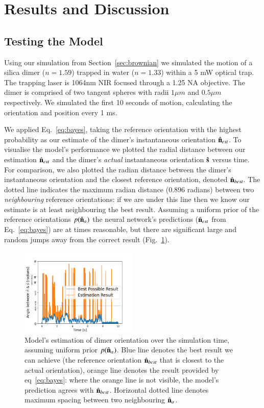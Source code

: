 \documentclass[final,  3p]{elsarticle}
\begin{document}
\section{Results and  Discussion}
\label{sec:Discussion}\subsection{Testing the Model}
\label{sec:test}
Using our simulation from Section~\ref{sec:brownian} we simulated the motion of a silica dimer ($n = 1.59$) trapped in water ($n = 1.33$) within a 5 mW optical trap. The trapping laser is 1064nm NIR focused through a 1.25 NA objective. The dimer is comprised of two tangent spheres with radii $1 \mu m$ and $0.5 \mu m$ respectively. We simulated the first 10 seconds of motion, calculating the orientation and position every 1 ms. 

We applied Eq.~\eqref{eq:bayes}, taking the reference orientation with the highest probability  as our estimate of the dimer's instantaneous orientation $\hat{\bf n}_{est}$. To visualise the model's performance  we plotted the radial distance between our estimation $\hat{\bf n}_{est}$ and the dimer's \emph{actual} instantaneous orientation $\hat{\bf s}$ versus time. For comparison, we also plotted the radian distance between the  dimer's instantaneous orientation and the closest reference orientation, denoted $\hat{\bf n}_{best}$. The dotted line indicates the maximum radian distance ($0.896$ radians) between two \textit{neighbouring} reference orientations: if we are under this line then we know our estimate is at least neighbouring the best result. Assuming a uniform prior of the reference orientations $p(\hat{\bf n}_\alpha)$  the neural network's predictions ($\hat{\bf n}_{est}$ from Eq.~\eqref{eq:bayes}) are at times reasonable, but there are significant large and random jumps away from the correct result (Fig.~\ref{fig:uniform}). 

\begin{figure}[h]
	\centering
	\includegraphics[width=0.5\textwidth]{./Images/fig3.png}
	\caption{Model's estimation of dimer orientation over the simulation time, assuming uniform prior $p(\hat{\bf n}_\alpha)$. Blue line denotes the best result we can achieve (the reference orientation $\hat{\bf n}_{best}$ that is closest to the actual orientation), orange line denotes the result provided by eq~\ref{eq:bayes}: where the orange line is not visible, the model's prediction agrees with $\hat{\bf n}_{best}$. Horizontal dotted line denotes maximum spacing between two neighbouring $\hat{\bf n}_\alpha$.}
	\label{fig:uniform}
\end{figure} 
\end{document}
